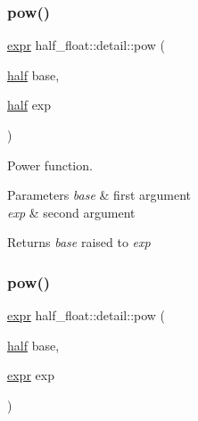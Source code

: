\subsubsection{\texorpdfstring{pow()}{pow()}\hspace{0.1cm}{\footnotesize\ttfamily [1/4]}}
{\footnotesize\ttfamily \hyperlink{structhalf__float_1_1detail_1_1expr}{expr} half\+\_\+float\+::detail\+::pow (\begin{DoxyParamCaption}\item[{\hyperlink{classhalf__float_1_1half}{half}}]{base,  }\item[{\hyperlink{classhalf__float_1_1half}{half}}]{exp }\end{DoxyParamCaption})\hspace{0.3cm}{\ttfamily [inline]}}

Power function. 
\begin{DoxyParams}{Parameters}
{\em base} & first argument \\
\hline
{\em exp} & second argument \\
\hline
\end{DoxyParams}
\begin{DoxyReturn}{Returns}
{\itshape base} raised to {\itshape exp} 
\end{DoxyReturn}
\mbox{\label{namespacehalf__float_1_1detail_a7289d67db5c1b06379f40586325de380}} 
\subsubsection{\texorpdfstring{pow()}{pow()}\hspace{0.1cm}{\footnotesize\ttfamily [2/4]}}
{\footnotesize\ttfamily \hyperlink{structhalf__float_1_1detail_1_1expr}{expr} half\+\_\+float\+::detail\+::pow (\begin{DoxyParamCaption}\item[{\hyperlink{classhalf__float_1_1half}{half}}]{base,  }\item[{\hyperlink{structhalf__float_1_1detail_1_1expr}{expr}}]{exp }\end{DoxyParamCaption})\hspace{0.3cm}{\ttfamily [inline]}}

\mbox{\label{namespacehalf__float_1_1detail_a05cde994c26a250d02d8fc9607396837}} 
